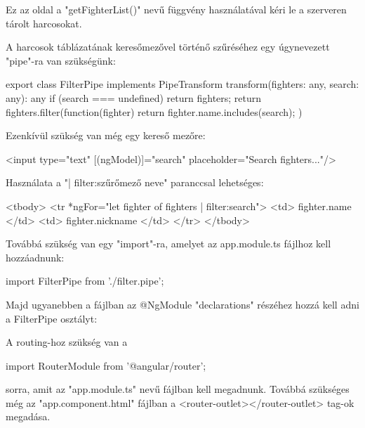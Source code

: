 Ez az oldal a "getFighterList()" nevű függvény használatával kéri le a szerveren tárolt harcosokat.

A harcosok táblázatának keresőmezővel történő szűréséhez egy úgynevezett "pipe"-ra van szükségünk:

\begin{cpp}
export class FilterPipe implements PipeTransform {
  transform(fighters: any, search: any): any {
    if (search === undefined) return fighters;
    return fighters.filter(function(fighter){
    	return fighter.name.includes(search);  })}}
\end{cpp}

Ezenkívül szükség van még egy kereső mezőre: 

\begin{cpp}
<input type="text" [(ngModel)]="search" 
placeholder="Search fighters..."/>
\end{cpp}

Használata a "| filter:szűrőmező neve" paranccsal lehetséges:

\begin{cpp}
<tbody>
      <tr *ngFor="let fighter of fighters | filter:search">
        <td>{{ fighter.name }}</td>
        <td>{{ fighter.nickname }}</td>
      </tr>
    </tbody>
\end{cpp}

Továbbá szükség van egy "import"-ra, amelyet az app.module.ts fájlhoz kell hozzáadnunk:

\begin{cpp}
import { FilterPipe } from './filter.pipe';
\end{cpp}

Majd ugyanebben a fájlban az @NgModule "declarations" részéhez hozzá kell adni a FilterPipe osztályt:

\begin{cpp}
@NgModule({
  declarations: [
    AppComponent,
    HomeComponent,
    FighterComponent,
    FilterPipe
\end{cpp}


A routing-hoz szükség van a

\begin{cpp}
import { RouterModule } from '@angular/router';
\end{cpp}

sorra, amit az "app.module.ts" nevű fájlban kell megadnunk.
Továbbá szükséges még az "app.component.html" fájlban a <router-outlet></router-outlet> tag-ok megadása.


